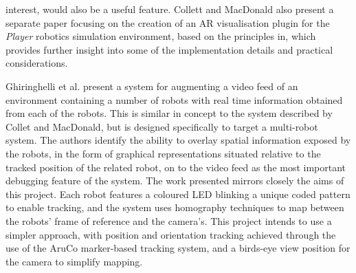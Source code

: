 \documentclass[titlepage,hidelinks,10pt]{article}
\begin{document}
interest, would also be a useful feature. Collett and MacDonald also present a separate paper focusing on the creation of an AR visualisation plugin for the \textit{Player}\cite{Player} robotics simulation environment, based on the principles in\cite{AugmentedRealityDebuggingSystem}, which provides further insight into some of the implementation details and practical considerations\cite{ARForPlayer}.

Ghiringhelli et al. present a system for augmenting a video feed of an environment containing a number of robots with real time information obtained from each of the robots\cite{LEDSwarmAR}. This is similar in concept to the system described by Collet and MacDonald, but is designed specifically to target a multi-robot system. The authors identify the ability to overlay spatial information exposed by the robots, in the form of graphical representations situated relative to the tracked position of the related robot, on to the video feed as the most important debugging feature of the system. The work presented mirrors closely the aims of this project. Each robot features a coloured LED blinking a unique coded pattern to enable tracking, and the system uses homography techniques to map between the robots' frame of reference and the camera's. This project intends to use a simpler approach, with position and orientation tracking achieved through the use of the AruCo marker-based tracking system, and a birds-eye view position for the camera to simplify mapping.
\end{document}
